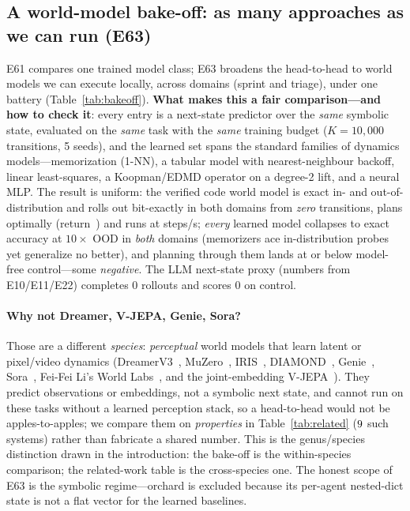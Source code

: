 \documentclass[11pt]{article}
\begin{document}
\subsection{A world-model bake-off: as many approaches as we can run (E63)}\label{sec:bakeoff}
E61 compares one trained model class; E63 broadens the head-to-head to
\BakeMethods{} world models we can execute locally, across \BakeDomains{} domains
(sprint and triage), under one battery (Table~\ref{tab:bakeoff}). \textbf{What
makes this a fair comparison---and how to check it}: every entry is a next-state
predictor over the \emph{same} symbolic state, evaluated on the \emph{same} task
with the \emph{same} training budget ($K{=}10{,}000$ transitions, 5 seeds), and the
learned set spans the standard families of dynamics models---memorization (1-NN),
a tabular model with nearest-neighbour backoff, linear least-squares, a
Koopman/EDMD operator on a degree-2 lift, and a neural MLP. The result is uniform:
the verified code world model is exact in- and out-of-distribution and rolls out
bit-exactly in both domains from \emph{zero} transitions, plans optimally
(return~\BakeCodeReturn) and runs at \BakeCodeSpeed{} steps/s; \emph{every} learned
model collapses to \BakeLearnedOodMax{} exact accuracy at $10\times$ OOD in
\emph{both} domains (memorizers ace in-distribution probes yet generalize no
better), and planning through them lands at or below model-free control---some
\emph{negative}. The LLM next-state proxy (numbers from E10/E11/E22) completes
$0$ rollouts and scores $0$ on control.

\paragraph{Why not Dreamer, V-JEPA, Genie, Sora?} Those are a different
\emph{species}: \emph{perceptual} world models that learn latent or pixel/video
dynamics (DreamerV3~\cite{dreamerv3}, MuZero~\cite{muzero}, IRIS~\cite{iris2023},
DIAMOND~\cite{diamond2024}, Genie~\cite{genie2024}, Sora~\cite{sora2024}, Fei-Fei
Li's World Labs~\cite{worldlabs2025}, and the joint-embedding
V-JEPA~\cite{vjepa2025}). They predict observations or embeddings, not a symbolic
next state, and cannot run on these tasks without a learned perception stack, so a
head-to-head would not be apples-to-apples; we compare them on \emph{properties}
in Table~\ref{tab:related} ($9$ such systems) rather than fabricate a
shared number. This is the genus/species distinction drawn in the introduction:
the bake-off is the within-species comparison; the related-work table is the
cross-species one. The honest scope of E63 is the symbolic regime---orchard is
excluded because its per-agent nested-dict state is not a flat vector for the
learned baselines.
\end{document}
